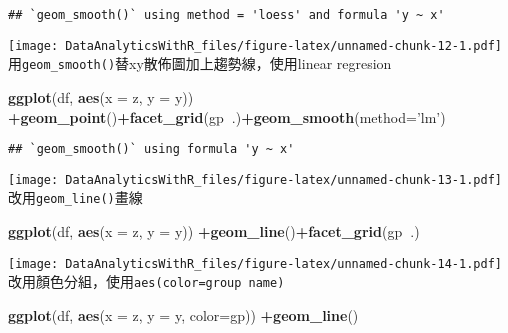 \documentclass[
]{book}
\newenvironment{Shaded}{\begin{snugshade}}{\end{snugshade}}
\newcommand{\DataTypeTok}[1]{\textcolor[rgb]{0.13,0.29,0.53}{#1}}
\newcommand{\KeywordTok}[1]{\textcolor[rgb]{0.13,0.29,0.53}{\textbf{#1}}}
\newcommand{\NormalTok}[1]{#1}
\newcommand{\OperatorTok}[1]{\textcolor[rgb]{0.81,0.36,0.00}{\textbf{#1}}}
\newcommand{\StringTok}[1]{\textcolor[rgb]{0.31,0.60,0.02}{#1}}
\begin{document}
\begin{verbatim}
## `geom_smooth()` using method = 'loess' and formula 'y ~ x'
\end{verbatim}

\texttt{[image: DataAnalyticsWithR\_files/figure-latex/unnamed-chunk-12-1.pdf]}
用\texttt{geom\_smooth()}替xy散佈圖加上趨勢線，使用linear regresion

\begin{Shaded}
\begin{Highlighting}[]
\KeywordTok{ggplot}\NormalTok{(df, }\KeywordTok{aes}\NormalTok{(}\DataTypeTok{x =}\NormalTok{ z, }\DataTypeTok{y =}\NormalTok{ y)) }\OperatorTok{+}\KeywordTok{geom_point}\NormalTok{()}\OperatorTok{+}\KeywordTok{facet_grid}\NormalTok{(gp}\OperatorTok{~}\NormalTok{.)}\OperatorTok{+}\KeywordTok{geom_smooth}\NormalTok{(}\DataTypeTok{method=}\StringTok{'lm'}\NormalTok{)}
\end{Highlighting}
\end{Shaded}

\begin{verbatim}
## `geom_smooth()` using formula 'y ~ x'
\end{verbatim}

\texttt{[image: DataAnalyticsWithR\_files/figure-latex/unnamed-chunk-13-1.pdf]}
改用\texttt{geom\_line()}畫線

\begin{Shaded}
\begin{Highlighting}[]
\KeywordTok{ggplot}\NormalTok{(df, }\KeywordTok{aes}\NormalTok{(}\DataTypeTok{x =}\NormalTok{ z, }\DataTypeTok{y =}\NormalTok{ y)) }\OperatorTok{+}\KeywordTok{geom_line}\NormalTok{()}\OperatorTok{+}\KeywordTok{facet_grid}\NormalTok{(gp}\OperatorTok{~}\NormalTok{.)}
\end{Highlighting}
\end{Shaded}

\texttt{[image: DataAnalyticsWithR\_files/figure-latex/unnamed-chunk-14-1.pdf]}
改用顏色分組，使用\texttt{aes(color=\textquotesingle{}group\ name\textquotesingle{})}

\begin{Shaded}
\begin{Highlighting}[]
\KeywordTok{ggplot}\NormalTok{(df, }\KeywordTok{aes}\NormalTok{(}\DataTypeTok{x =}\NormalTok{ z, }\DataTypeTok{y =}\NormalTok{ y, }\DataTypeTok{color=}\NormalTok{gp)) }\OperatorTok{+}\KeywordTok{geom_line}\NormalTok{()}
\end{Highlighting}
\end{Shaded}
\end{document}
